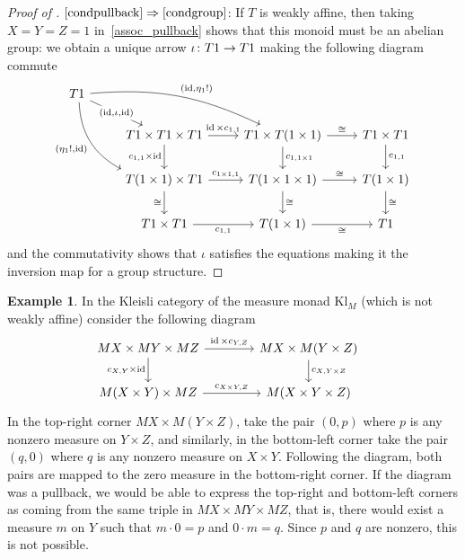 \documentclass[a4paper,UKenglish,numberwithinsect,cleveref, autoref, thm-restate]{lipics-v2021}
\theoremstyle{plain} %
\theoremstyle{definition} %
\newtheorem{myexample}[mytheorem]{Example}
\begin{document}
\begin{proof}[Proof of ]
 $\ref{condpullback}\Rightarrow\ref{condgroup}$:
 If $T$ is weakly affine, then taking $X = Y = Z = 1$ in~\eqref{assoc_pullback} shows that this monoid must be an abelian group: we obtain a unique arrow $\iota \colon T1 \to T1$ making the following diagram commute
	\[
		\begin{tikzcd}
			T1 \ar{dr}[description]{(\id,\iota,\id)} \ar[bend left=15]{drr}{(\id,\eta_1 !)} \ar[bend right,swap]{ddr}{(\eta_1 !,\id)} \\
			&	T1 \times T1 \times T1 \ar{r}{\id \times c_{1,1}} \ar[swap]{d}{c_{1,1} \times \id}	& T1 \times T(1\times 1) \ar{d}{c_{1,1\times 1}} \ar{r}{\cong} & T1\times T1 \ar{d}{c_{1,1}}	\\
			&	T(1\times 1) \times T1 \ar{r}{c_{1\times 1,1}} \ar{d}[swap]{\cong}	& T(1\times 1\times 1) \ar{d}{\cong} \ar{r}{\cong} & T(1\times 1) \ar{d}{\cong} \\
			& T1\times T1 \ar{r}[swap]{c_{1,1}} & T(1\times 1) \ar{r}[swap]{\cong} & T1
		\end{tikzcd}
	\]
	and the commutativity shows that $\iota$ satisfies the equations making it the inversion map for a group structure.
\end{proof}


\begin{myexample}
 In the Kleisli category of the measure monad $\mathrm{Kl}_M$ (which is not weakly affine) consider the following diagram
 \[
		\hspace{-9pt}	%
		\begin{tikzcd}[column sep=3.3pc]
			MX \times MY \times MZ \ar{r}{\id \times c_{Y,Z}} \ar[swap]{d}{c_{X,Y} \times \id}	& MX \times M(Y \times Z) \ar{d}{c_{X,Y \times Z}}	\\
			M(X \times Y) \times MZ \ar{r}{c_{X\times Y,Z}}						& M(X \times Y \times Z)
		\end{tikzcd}
	\]
	In the top-right corner $MX\times M(Y\times Z)$, take the pair $(0,p)$ where $p$ is any nonzero measure on $Y\times Z$, and similarly, in the bottom-left corner take the pair $(q,0)$ where $q$ is any nonzero measure on $X\times Y$. Following the diagram, both pairs are mapped to the zero measure in the bottom-right corner. If the diagram was a pullback, we would be able to express the top-right and bottom-left corners as coming from the same triple in $MX\times MY\times MZ$, that is, there would exist a measure $m$ on $Y$ such that $m\cdot 0=p$ and $0\cdot m=q$. Since $p$ and $q$ are nonzero, this is not possible.
\end{myexample}
\end{document}
